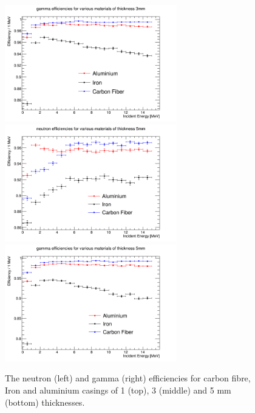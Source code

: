 \begin{figure}[htbp]
\begin{center}
\includegraphics[width=75mm]{Chapter6/figures/gamma3mmMaterialsEfficiency0-16MeV.png}
\includegraphics[width=75mm]{Chapter6/figures/neutron5mmMaterialsEfficiency0-16MeV.png}
\includegraphics[width=75mm]{Chapter6/figures/gamma5mmMaterialsEfficiency0-16MeV.png}
\caption{The neutron (left) and gamma (right) efficiencies for carbon fibre, Iron and aluminium casings of 1 (top), 3 (middle) and 5 mm (bottom) thicknesses.}
\label{fig:efficienciesMaterial}
\end{center}
\end{figure}

